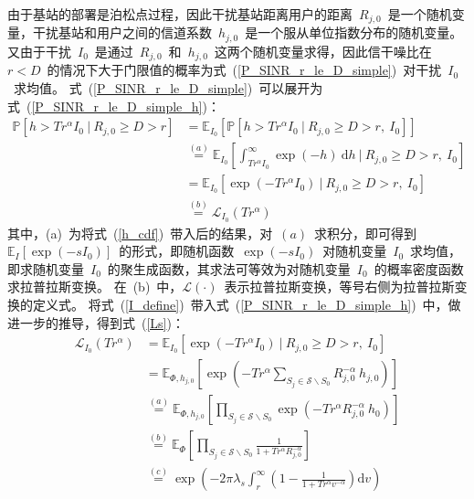 由于基站的部署是泊松点过程，因此干扰基站距离用户的距离~$R_{j,0}$~是一个随机变量，干扰基站和用户之间的信道系数~$h_{j,0}$~是一个服从单位指数分布的随机变量。
又由于干扰~$I_0$~是通过~$R_{j,0}$~和~$h_{j,0}$~这两个随机变量求得，因此信干噪比在~$r<D$~的情况下大于门限值的概率为式~(\ref{P_SINR_r_le_D_simple})~对干扰~$I_0$~求均值。
式~(\ref{P_SINR_r_le_D_simple})~可以展开为式~(\ref{P_SINR_r_le_D_simple_h})：
\begin{equation}\label{P_SINR_r_le_D_simple_h}
  \begin{aligned}
    \mathbb{P}\left[h > T r ^ \alpha I_0 ~\bigg|~ R_{j,0} \geq D > r \right] & = \mathbb{E}_{I_0}\left[\mathbb{P}\left[h > T r ^ \alpha I_0 ~\big|~ R_{j,0} \geq D > r,~ I_0 \right]\right] \\
                                                                           & \overset{(a)}{=} \mathbb{E}_{I_0}\left[\int_{T r ^{\alpha} I_0}^{\infty} \exp(-h)~\mathrm{d} h~\bigg|~ R_{j,0} \geq D > r,~ I_0\right] \\
                                                                           & = \mathbb{E}_{I_0}\left[ \exp(-Tr^\alpha I_0)~\big|~ R_{j,0} \geq D > r,~ I_0\right] \\
                                                                           & \overset{(b)}{=} \mathcal{L}_{I_0}(Tr^\alpha)
  \end{aligned}
\end{equation}
其中，(a)~为将式~(\ref{h_cdf})~带入后的结果，对~$(a)$~求积分，即可得到~$\mathbb{E}_{I}[\exp(-sI_0)]$~的形式，即随机函数~$\exp(-sI_0)$~对随机变量~$I_0$~求均值，即求随机变量~$I_0$~的聚生成函数，其求法可等效为对随机变量~$I_0$~的概率密度函数求拉普拉斯变换。
在~(b)~中，$\mathcal{L}(\cdot)$~表示拉普拉斯变换，等号右侧为拉普拉斯变换的定义式。
将式~(\ref{I_define})~带入式~(\ref{P_SINR_r_le_D_simple_h})~中，做进一步的推导，得到式~(\ref{Ls})：
\begin{equation}\label{Ls}
  \begin{aligned}
    \mathcal{L}_{I_0}(Tr^\alpha) &= \mathbb{E}_{I_0}\left[ \exp(-Tr^\alpha I_0)~\big|~ R_{j,0} \geq D > r,~ I_0\right] \\
                               &= \mathbb{E}_{\Phi, h_{j,0}}\left[\exp(-Tr^{\alpha}\sum\limits_{S_j\in \mathcal{S}\backslash S_0} {R_{j,0}^{-\alpha} ~ h_{j,0}})\right] \\
                               &\overset{(a)}{=} \mathbb{E}_{\Phi, h_{j,0}}\left[\prod\limits_{S_j\in \mathcal{S}\backslash S_0}\exp(-Tr^{\alpha} {R_{j,0}^{-\alpha} ~ h_0})\right] \\
                               &\overset{(b)}{=} \mathbb{E}_{\Phi} \left[\prod\limits_{S_j\in \mathcal{S}\backslash S_0}\frac{1}{1+ T r ^\alpha R_{j,0}^{-\alpha}}\right] \\
                               &\overset{(c)}{=} \exp\left(-2\pi\lambda_s\int_{r}^{\infty} \left(1 - \frac{1}{1+ T r ^\alpha v^{-\alpha}}\right)\mathrm{d}v\right)
  \end{aligned}
\end{equation}
